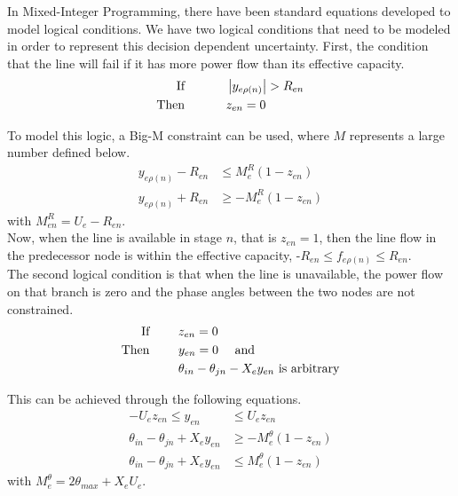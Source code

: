 In Mixed-Integer Programming, there have been standard equations developed to model logical conditions.  We have two logical conditions that need to be modeled in order to represent this decision dependent uncertainty.  First, the condition that the line will fail if it has more power flow than its effective capacity.
\begin{align*}
\mbox{If }
		\hspace{30px}&\left| y_{e\rho(n)} \right| > R_{en}  \\
\mbox{Then }
		\hspace{30px}&z_{en} = 0
\end{align*}

To model this logic, a Big-M constraint can be used, where $M$ represents a large number defined below.
\begin{align}
	y_{e\rho(n)} - R_{en} &\le M^R_e (1-z_{en})	\label{r1}\\
	y_{e\rho(n)} + R_{en} &\ge - M^R_e (1-z_{en})	\label{r2}
\end{align}
with $M^R_{en} = U_e - R_{en}$. \\

Now, when the line is available in stage $n$, that is $z_{en} = 1$, then the line flow in the predecessor node is within the effective capacity, -$R_{en} \le f_{e\rho(n)} \le R_{en}$.		\\

The second logical condition is that when the line is unavailable, the power flow on that branch is zero and the phase angles between the two nodes are not constrained. 
\begin{align*}
\mbox{If }
		\hspace{20px}&z_{en} = 0	\\
\mbox{Then }
		\hspace{20px}&y_{en} = 0  \hspace{10px} \mbox{ and}\\
				&\theta_{in} - \theta_{jn} - X_{e}y_{en} \mbox{ is arbitrary}
\end{align*}	

This can be achieved through the following equations.
\begin{align}
-U_{e} z_{en} \le y_{en} &\le U_{e} z_{en}	\label{lf1}\\
\theta_{in} - \theta_{jn} + X_e y_{en} &\ge -M^\theta_e(1-z_{en}) \label{lf2} \\
\theta_{in} - \theta_{jn} + X_e y_{en} &\le M^\theta_e(1-z_{en})  \label{lf3}
\end{align}
with $M^\theta_e = 2 \theta_{max} + X_e U_e$.


